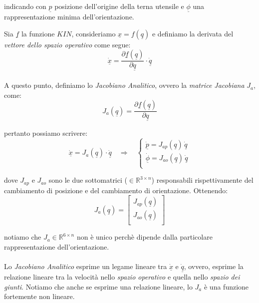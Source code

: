 indicando con $\underline{p}$ posizione dell'origine della terna utensile e $\underline{\phi}$ una rappresentazione minima dell'orientazione.

Sia $\underline{f}$ la funzione $KIN$, consideriamo $\underline{x} = f(\underline{q})$ e definiamo la derivata del \emph{vettore dello spazio operativo} come segue:
\begin{equation}
	\dot{\underline{x}} =   \frac{\partial \underline{f}(\underline{q})}{\partial \underline{q}} \cdot \underline{\dot{q}}
\end{equation}

\paragraph{}
A questo punto, definiamo lo \emph{Jacobiano Analitico}, ovvero la \emph{matrice Jacobiana} $J_{a}$, come:
\begin{equation}
	J_a(\underline{q}) = \frac{\partial \underline{f}(\underline{q})}{\partial \underline{q}}
\end{equation}

pertanto possiamo scrivere:
\begin{equation}
	\dot{\underline{x}} = J_a(\underline{q}) \cdot \dot{\underline{q}} \quad \Rightarrow \quad 
	\begin{cases}
		\dot{\underline{p}} = J_{ap}(\underline{q})\,\underline{\dot{q}} \\
		\dot{\underline{\phi}} = J_{ao}(\underline{q})\,\dot{\underline{q}} \\
	\end{cases} 
\end{equation}

dove $J_{ap}$ e $J_{ao}$ sono le due sottomatrici ($\in\mathbb{R}^{3\times n}$) responsabili rispettivamente del cambiamento di posizione e del cambiamento di orientazione. Ottenendo:
\begin{equation}
	J_a(\underline{q}) = 
	\begin{bmatrix}
		J_{ap}(\underline{q}) \\
		J_{ao}(\underline{q})\\
	\end{bmatrix}
\end{equation}

notiamo che $J_a\in\mathbb{R}^{6 \times n}$ non è unico perchè dipende dalla particolare rappresentazione dell'orientazione. 
\paragraph{}
Lo \emph{Jacobiano Analitico} esprime un legame lineare tra $\dot{\underline{x}}$ e $\dot{\underline{q}}$, ovvero, esprime la relazione lineare tra la velocità nello \emph{spazio operativo} e quella nello \emph{spazio dei giunti}. Notiamo che anche se esprime una relazione lineare, lo $J_a$ è una funzione fortemente non lineare.

